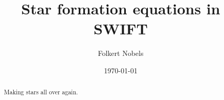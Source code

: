 \documentclass[fleqn, usenatbib, useAMS, a4paper]{mnras}
\title{Star formation equations in SWIFT}
\author{Folkert Nobels}
\begin{document}
\date{\today}

\pagerange{\pageref{firstpage}--\pageref{lastpage}} 

\maketitle

\label{firstpage}

\begin{abstract}
Making stars all over again.
\end{abstract}

\begin{keywords}
\end{keywords}








\label{lastpage}
\end{document}
